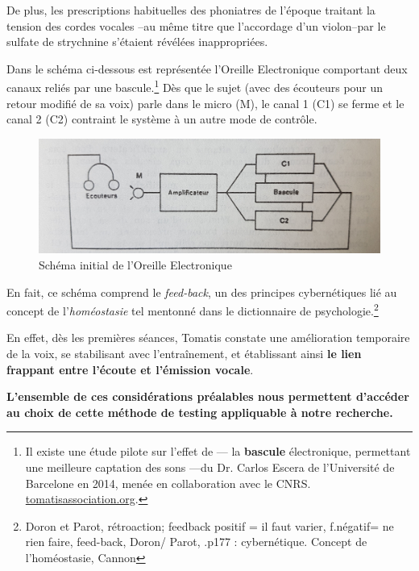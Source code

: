  De plus, les prescriptions habituelles des phoniatres de
l'époque traitant la tension des cordes vocales --au même titre que
l'accordage d'un violon--par le sulfate de
strychnine s'étaient révélées inappropriées.

Dans le schéma ci-dessous est représentée l'Oreille Electronique
comportant deux canaux reliés par une bascule.\footnote{Il existe une étude pilote sur l'effet de 
--- la \textbf{bascule} \label{bascule} électronique, permettant une meilleure
captation des sons ---du Dr. Carlos Escera
de l'Université de Barcelone en 2014, menée en collaboration avec le CNRS.
\href{http://tomatisassociation.org/scientific-validation-of-the-tomatis-effect-
eeg-recordings-of-sound-from-brainstem-to-cerebral-cortex-encoding-university-of
-barcelona-2014/}{tomatisassociation.org}.}  \label{bascule}
 Dès que le sujet (avec
des écouteurs pour un retour modifié de sa voix) parle
dans le micro (M), le canal 1 (C1) se ferme et  le canal 2 (C2) contraint le
système à un autre mode de contrôle.

\begin{figure}
	\centering
	\includegraphics[width=0.7\linewidth]{images/oreilleelectro.jpg}
	\caption[oreilleelectro]{Schéma initial de l'Oreille
          Electronique}
       
	\label{oreilleelectro}
\end{figure}


      
En fait, ce schéma comprend le\textit{ feed-back}, un des principes
cybernétiques lié au concept de l'\textit{homéostasie} tel
mentonné dans le dictionnaire de psychologie.\autocite[298]{doronparot}\footnote{Doron et Parot, rétroaction;
  feedback positif = il faut varier, f.négatif= ne rien faire,  feed-back, Doron/ Parot, .p177 : cybernétique. Concept de l'homéostasie, Cannon}



 En effet, dès les premières
séances, Tomatis constate une amélioration temporaire de la voix, se
stabilisant avec l'entraînement, et établissant ainsi
\textbf{le lien frappant entre l'écoute et
  l'émission vocale}.

\textbf{L'ensemble de ces considérations préalables nous permettent d'accéder au choix de
cette méthode de testing appliquable à notre recherche.}
